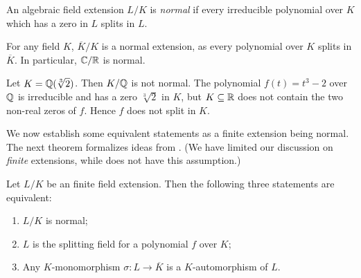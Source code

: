 \begin{definition}
    An algebraic field extension $L/ K$ is \textit{normal} if every irreducible polynomial over $K$ which has a zero in $L$ splits in $L$. 
\end{definition}

\begin{example}
	For any field $K$, $\overline K / K$ is a normal extension, as every polynomial over $K$ splits in $\overline K$. In particular, $\mathbb C / \mathbb R$ is normal. 
\end{example}


\begin{example}
    Let $K = \mathbb Q(\sqrt[3]{2})$. Then $K / \mathbb Q$ is not normal. The polynomial $f(t) = t^3 - 2$ over $\mathbb Q$ is irreducible and has a zero $\sqrt[3]{2}$ in $K$, but $K \subseteq \mathbb R$ does not contain the two non-real zeros of $f$. Hence $f$ does not split in $K$.
\end{example}

We now establish some equivalent statements as a finite extension being normal. The next theorem formalizes ideas from \cite{galois-theory-lectures}. (We have limited our discussion on \textit{finite} extensions, while \cite{galois-theory-lectures} does not have this assumption.)

\begin{theorem} \label{thm:normal-equiv-def}
    Let $L/K$ be an finite field extension. Then the following three statements are equivalent:
    \begin{enumerate}[label=(\roman*)]
        \item $L/K$ is normal;
        \item $L$ is the splitting field for a polynomial $f$ over $K$;
        \item Any $K$-monomorphism $\sigma: L \to \overline K$ is a $K$-automorphism of $L$. 
    \end{enumerate}
\end{theorem}


